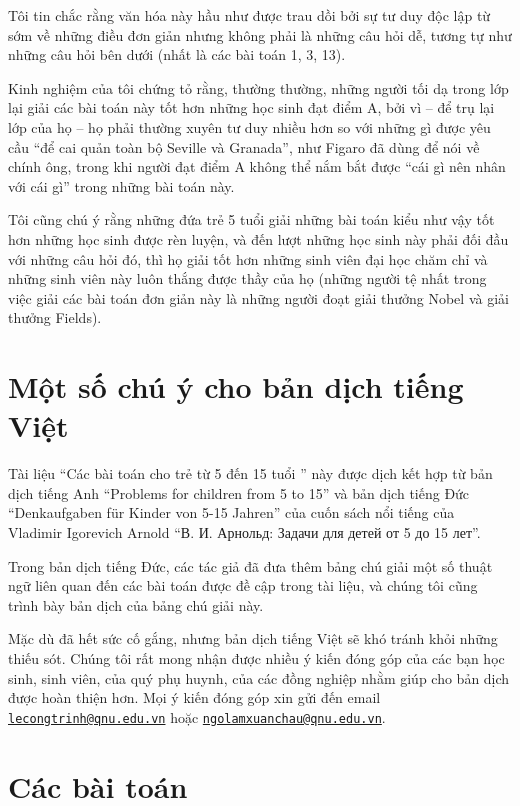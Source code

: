 Tôi tin chắc rằng văn hóa này hầu như được trau dồi bởi sự tư duy độc lập từ sớm về những điều đơn giản nhưng không phải là những câu hỏi dễ, tương tự như những câu hỏi bên dưới (nhất là các bài toán 1, 3, 13).

Kinh nghiệm của tôi chứng tỏ rằng, thường thường, những người tối dạ trong lớp lại giải các bài toán này tốt hơn những học sinh đạt điểm A, bởi vì -- để trụ lại lớp của họ -- họ phải thường xuyên tư duy nhiều hơn so với những gì được yêu cầu \enquote{để cai quản toàn bộ Seville và Granada}, như Figaro đã dùng để nói về chính ông, trong khi người đạt điểm A không thể nắm bắt được \enquote{cái gì nên nhân với cái gì} trong những bài toán này.

Tôi cũng chú ý rằng những đứa trẻ 5 tuổi giải những bài toán kiểu như vậy tốt hơn những học sinh được rèn luyện, và đến lượt những học sinh này phải đối đầu với những câu hỏi đó, thì họ giải tốt hơn những sinh viên đại học chăm chỉ và những sinh viên này luôn thắng được thầy của họ (những người tệ nhất trong việc giải các bài toán đơn giản này là những người đoạt giải thưởng Nobel và giải thưởng Fields).

\clearpage
\section*{Một số chú ý cho bản dịch tiếng Việt}
Tài liệu \enquote{Các bài toán cho trẻ từ 5 đến 15 tuổi } này được dịch kết hợp từ bản dịch tiếng Anh \enquote{Problems for children from 5 to 15} và bản dịch tiếng Đức \enquote{Denkaufgaben f\"{u}r Kinder von 5-15 Jahren} của cuốn sách nổi tiếng của Vladimir Igorevich Arnold {\enquote{{В. И. Арнольд: Задачи для детей от 5 до 15 лет}}}.

Trong bản dịch tiếng Đức, các tác giả đã đưa thêm bảng chú giải một số thuật ngữ liên quan đến các bài toán được đề cập trong tài liệu, và chúng tôi cũng trình bày bản dịch của bảng chú giải này.

Mặc dù đã hết sức cố gắng, nhưng bản dịch tiếng Việt sẽ khó tránh khỏi những thiếu sót. Chúng tôi rất mong nhận được nhiều ý kiến đóng góp của các bạn học sinh, sinh viên, của quý phụ huynh, của các đồng nghiệp nhằm giúp cho bản dịch được hoàn thiện hơn. Mọi ý kiến đóng góp xin gửi đến email \href{mailto:lecongtrinh@qnu.edu.vn}{\nolinkurl{lecongtrinh@qnu.edu.vn}} hoặc \href{mailto:ngolamxuanchau@qnu.edu.vn}{\nolinkurl{ngolamxuanchau@qnu.edu.vn}}.

\clearpage
\section*{Các bài toán}

